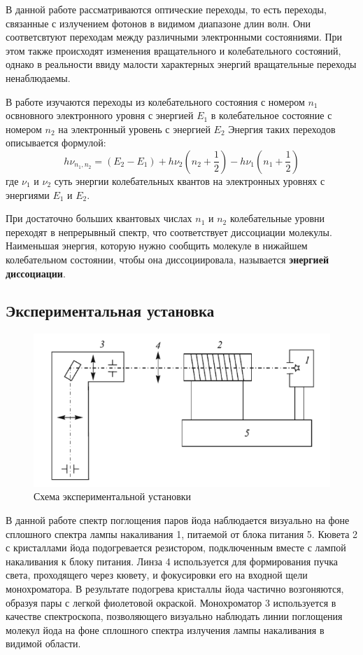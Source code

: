 \documentclass[a4paper,12pt]{article}
\begin{document}
В данной работе рассматриваются оптические переходы, то есть переходы, связанные с излучением фотонов в видимом диапазоне длин волн. Они соответсвтуют переходам между различными электронными состояниями. При этом также происходят изменения вращательного и колебательного состояний, однако в реальности ввиду малости характерных энергий вращательные переходы ненаблюдаемы.

В работе изучаются переходы из колебательного состояния с номером $n_1$ освновного электронного уровня с энергией $E_1$ в колебательное состояние с номером $n_2$ на электронный уровень с энергией $E_2$ Энергия таких переходов описывается формулой:
\begin{equation}
    h\nu_{n_1,n_2} = (E_2-E_1) + h\nu_2(n_2+\frac{1}{2})-h\nu_1(n_1+\frac{1}{2})
\end{equation}
где $\nu_1$ и $\nu_2$ суть энергии колебательных квантов на электронных уровнях с энергиями $E_1$ и $E_2$.

При достаточно больших квантовых числах $n_1$ и $n_2$ колебательные уровни переходят в непрерывный спектр, что соответствует диссоциации молекулы. Наименьшая энергия, которую нужно сообщить молекуле в нижайшем колебательном состоянии, чтобы она диссоциировала, называется \textbf{энергией диссоциации}.

\subsection{Экспериментальная установка}

\begin{figure}[h]
\centering
\includegraphics[width=0.6\linewidth]{img5.png}
\caption{Схема экспериментальной установки}
\label{img5}
\end{figure}

В данной работе спектр поглощения паров йода наблюдается визуально на фоне сплошного спектра лампы накаливания 1, питаемой от блока питания 5. Кювета 2 с кристаллами йода подогревается резистором, подключенным вместе с лампой накаливания к блоку питания. Линза 4 используется для формирования пучка света, проходящего через кювету, и фокусировки его на входной щели монохроматора. В результате подогрева кристаллы йода частично возгоняются, образуя пары с легкой фиолетовой окраской. Монохроматор 3 используется в качестве спектроскопа, позволяющего визуально наблюдать линии поглощения молекул йода на фоне сплошного спектра излучения лампы накаливания в видимой области.
\end{document}
